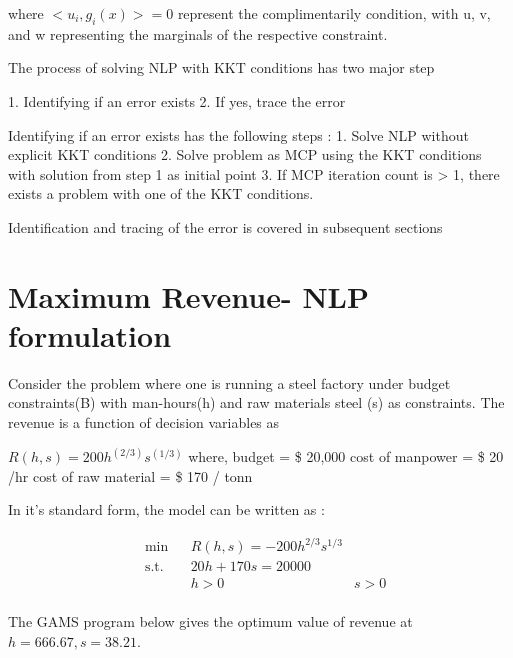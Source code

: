 \documentclass{article}
\begin{document}
where $<u_{i},g_{i}(x)> = 0$  represent the complimentarily condition, with u, v, and w representing the marginals of the respective constraint.

The process of solving NLP with KKT conditions has two major step

1. Identifying if an error exists
2. If yes, trace the error

Identifying if an error exists has the following steps :
1. Solve NLP without explicit KKT conditions
2. Solve problem as MCP using the KKT conditions with solution from step 1 as initial point
3. If MCP iteration count is > 1, there exists a problem with one of the KKT conditions.

Identification and tracing of the error is covered in subsequent sections



\section{Maximum Revenue- NLP formulation}

Consider the problem where one is running a steel factory under budget constraints(B) with man-hours(h) and raw materials steel (s) as constraints. The revenue is a function of decision variables as 

$R(h,s) = 200 h^(2/3)s^(1/3) $
where, budget = \$ 20,000 
cost of manpower = \$ 20 /hr
cost of raw material = \$ 170 / tonn

In it's standard form, the model can be written as :

\begin{equation}
\begin{aligned}
&	\min 
& & R(h,s) = - 200 h^{2/3}s^{1/3}  \\
& \text{s.t.} & & 	 20h + 170s = 20000 \\
& & &			h > 0	 &	s > 0 \\
\end{aligned}
\end{equation} 

The GAMS program below gives the optimum value of revenue at $h = 666.67 , s = 38.21$.
\end{document}
